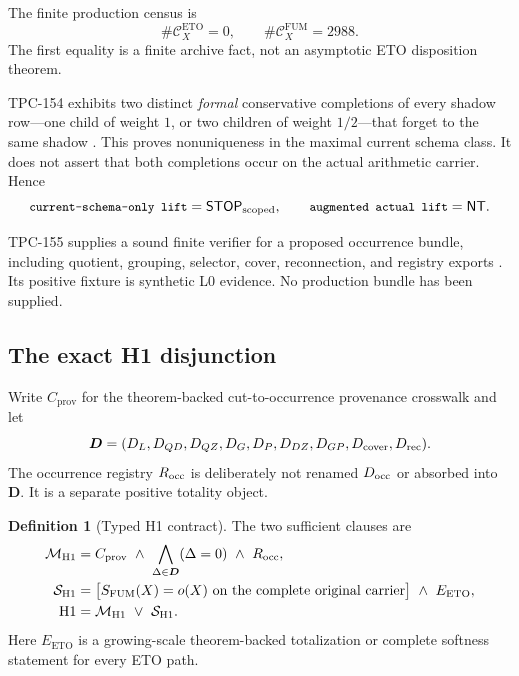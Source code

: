\documentclass[11pt]{article}
\theoremstyle{definition}
\newtheorem{definition}[theorem]{Definition}
\newcommand{\cM}{\mathcal M}
\newcommand{\cS}{\mathcal S}
\newcommand{\NT}{\mathsf{NT}}
\newcommand{\STOP}{\mathsf{STOP}}
\newcommand{\code}[1]{\texttt{\small #1}}
\begin{document}
The finite production census is
\[
  \#\mathcal C_X^{\mathrm{ETO}}=0,\qquad
  \#\mathcal C_X^{\mathrm{FUM}}=2988.
\]
The first equality is a finite archive fact, not an asymptotic ETO
disposition theorem.

TPC-154 exhibits two distinct \emph{formal} conservative completions
of every shadow row---one child of weight \(1\), or two children of
weight \(1/2\)---that forget to the same shadow
\cite{WangTPC154}.  This proves nonuniqueness in the maximal current
schema class.  It does not assert that both completions occur on the
actual arithmetic carrier.  Hence
\[
 \code{current-schema-only lift}=\STOP_{\rm scoped},
 \qquad
 \code{augmented actual lift}=\NT.
\]

TPC-155 supplies a sound finite verifier for a proposed occurrence
bundle, including quotient, grouping, selector, cover, reconnection,
and registry exports \cite{WangTPC155}.  Its positive fixture is
synthetic L0 evidence.  No production bundle has been supplied.

\subsection{The exact H1 disjunction}

Write \(C_{\mathrm{prov}}\) for the theorem-backed cut-to-occurrence
provenance crosswalk and let
\[
 \boldsymbol D=
 (D_L,D_{QD},D_{QZ},D_G,D_P,D_{DZ},D_{GP},D_{\rm cover},D_{\rm rec}).
\]
The occurrence registry \(R_{\rm occ}\) is deliberately not renamed
\(D_{\rm occ}\) or absorbed into \(\boldsymbol D\).  It is a separate
positive totality object.

\begin{definition}[Typed H1 contract]
\label{def:h1}
The two sufficient clauses are
\begin{align}
 \cM_{\mathrm{H1}}
  &=
  C_{\mathrm{prov}}
  \ \wedge\
  \bigwedge_{\Delta\in\boldsymbol D}(\Delta=0)
  \ \wedge\ R_{\rm occ},                                      \label{eq:map}\\
 \cS_{\mathrm{H1}}
  &=
  \bigl[S_{\mathrm{FUM}}(X)=o(X)
     \text{ on the complete original carrier}\bigr]
  \ \wedge\ E_{\mathrm{ETO}},                                 \label{eq:scalar}\\
 \mathrm{H1}
  &=\cM_{\mathrm{H1}}\ \vee\ \cS_{\mathrm{H1}}.                \label{eq:h1}
\end{align}
Here \(E_{\mathrm{ETO}}\) is a growing-scale theorem-backed
totalization or complete softness statement for every ETO path.
\end{definition}
\end{document}
